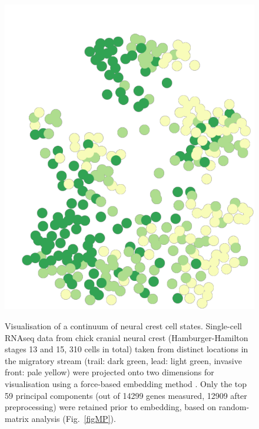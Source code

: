 \documentclass[review]{elsarticle}
\begin{document}
\begin{figure}
    \centering
    {\includegraphics[scale=0.25]{Neural_Crest_NC_59PCs_HH1315}}
    \caption{Visualisation of a continuum of neural crest cell states. Single-cell RNAseq data \cite{Morrison2017} from chick cranial neural crest (Hamburger-Hamilton stages 13 and 15, 310 cells in total) taken from distinct locations in the migratory stream (trail: dark green, lead: light green, invasive front: pale yellow) were projected onto two dimensions for visualisation using a force-based embedding method \cite{Weinreb2018}. Only the top 59 principal components (out of 14299 genes measured, 12909 after preprocessing) were retained prior to embedding, based on random-matrix analysis \cite{Aparicio2018} (Fig.~\ref{figMP}).\label{figscRNAseq}}
\end{figure}
\end{document}
